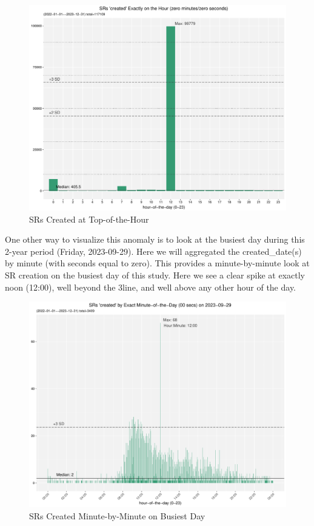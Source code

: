 \documentclass[12pt, titlepage]{article}
\begin{document}
	\begin{figure}[tbp]
		\centering
 		\includegraphics[width = \textwidth]
 		{2-year-trend-SR_created_by_top_of_hour.pdf}
		\caption{SRs Created at Top-of-the-Hour}
		\label{fig:tophourcreated}
	\end{figure}	

	One other way to visualize this anomaly is to look at the busiest day 
	during this 2-year period (Friday, 2023-09-29). Here we will aggregated 
	the created\_date(s) by minute (with seconds equal to zero). This 
	provides a minute-by-minute look at SR creation on the busiest day 
	of this study. Here we see a clear spike at exactly noon (12:00), well 
	beyond the 3\textsigma line, and well above any other hour of the day.
	
	\begin{figure}[tbp]
		\centering
		\includegraphics[width=\textwidth]
		{2-year-trend-SR_created_by_minute_of_busiest_day.pdf}
		\caption{SRs Created Minute-by-Minute on Busiest Day}
		\label{fig:busiestcreated}
	\end{figure}	
\end{document}
